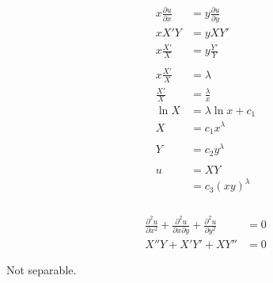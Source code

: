 \documentclass{article}
\begin{document}
\setcounter{subsubsection}{4}
\subsubsection{}

\begin{align*}
  x \frac{\partial u}{\partial x} & = y \frac{\partial u}{\partial y} \\
  x X' Y                          & = y X Y'                          \\
  x \frac{X'}{X}                  & = y \frac{Y'}{Y}                  \\ \\
  x \frac{X'}{X}                  & = \lambda                         \\
  \frac{X'}{X}                    & = \frac{\lambda}{x}               \\
  \ln X                           & = \lambda \ln x + c_1             \\
  X                               & = c_ 1 x^\lambda                  \\ \\
  Y                               & = c_2 y^\lambda                   \\ \\
  u                               & = X Y                             \\
                                  & = c_3 (x y)^\lambda
\end{align*}

\setcounter{subsubsection}{6}
\subsubsection{}

\begin{align*}
  \frac{\partial^2 u}{\partial x^2} + \frac{\partial^2 u}{\partial x \partial y} + \frac{\partial^2 u}{\partial y^2} & = 0 \\
  X'' Y + X' Y' + X Y''                                                                                              & = 0
\end{align*}

Not separable.

\setcounter{subsubsection}{8}
\subsubsection{}
\end{document}

